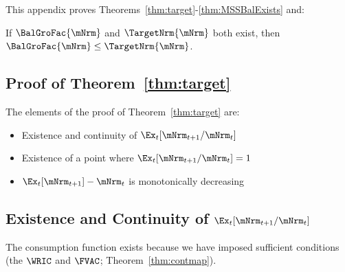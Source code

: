 \documentclass[\econtexRoot/BufferStockTheory]{subfiles}
\begin{document}

This appendix proves Theorems~\ref{thm:target}-\ref{thm:MSSBalExists} and:
\onlyinsubfile{\setcounter{theorem}{1}}

  \begin{lemma}\label{lemma:orderingPartOne}
  If $\BalGroFac{\mNrm}$ and $\TargetNrm{\mNrm}$ both exist, then $\BalGroFac{\mNrm} \leq \TargetNrm{\mNrm}$.
  \end{lemma}

  \begin{comment}
  \begin{lemma}\label{lemma:orderingPartTwo}
  If $\BalGroFac{\mNrm}$ and $\BalGroRte{\mNrm}$ both exist, then $\BalGroFac{\mNrm} \leq \BalGroRte{\mNrm}$.
  \end{lemma}
\end{comment}

 \subsection{Proof of Theorem~\ref{thm:target}}

  
  The elements of the proof of Theorem~\ref{thm:target} are:
\begin{itemize}
\item Existence and continuity of $\Ex_t [{\mNrm}_{t+1}/\mNrm_t]$
\item Existence of a point where $\Ex_t [{\mNrm}_{t+1}/\mNrm_t] = 1$
\item $\Ex_t [{\mNrm}_{t+1}]-\mNrm_{t}$ is monotonically decreasing
\end{itemize}


\subsection{Existence and Continuity of
  \texorpdfstring{$\Ex_t [{\mNrm}_{t+1}/\mNrm_t]$}{Ex-{t}[mNrm-{t+1}/mNrm-{t}]}}\label{subsubsec:RatExitsCont}
The consumption function exists because we have imposed sufficient conditions (the $\WRIC$ and $\FVAC$; Theorem~\ref{thm:contmap}). %
\end{document}
